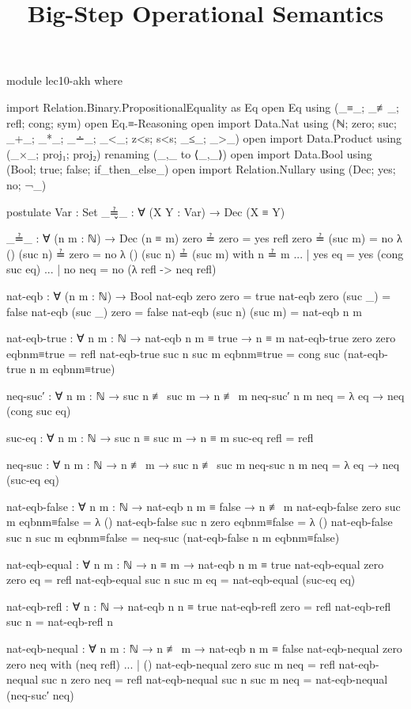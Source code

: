 \documentclass{lecturenotes}
\title{Big-Step Operational Semantics}
\begin{document}
\maketitle

\begin{code}[hide]
module lec10-akh where

import Relation.Binary.PropositionalEquality as Eq
open Eq using (_≡_; _≢_; refl; cong; sym)
open Eq.≡-Reasoning
open import Data.Nat using (ℕ; zero; suc; _+_; _*_; _∸_; _<_; z<s; s<s; _≤_; _>_)
open import Data.Product using (_×_; proj₁; proj₂) renaming (_,_ to ⟨_,_⟩)
open import Data.Bool using (Bool; true; false; if_then_else_)
open import Relation.Nullary using (Dec; yes; no; ¬_)

postulate
  Var : Set
  _≟̬_ : ∀ (X Y : Var) → Dec (X ≡ Y)

_≟_ : ∀ (n m : ℕ) → Dec (n ≡ m)
zero ≟ zero = yes refl
zero ≟ (suc m) = no λ ()
(suc n) ≟ zero = no λ ()
(suc n) ≟ (suc m) with n ≟ m
... | yes eq  = yes (cong suc eq)
... | no neq = no (λ {refl -> neq refl}) 

nat-eqb : ∀ (n m : ℕ) → Bool
nat-eqb zero zero = true
nat-eqb zero (suc _) = false
nat-eqb (suc _) zero = false
nat-eqb (suc n) (suc m) = nat-eqb n m

nat-eqb-true : ∀ {n m : ℕ} → nat-eqb n m ≡ true → n ≡ m
nat-eqb-true {zero} {zero} eqbnm≡true = refl
nat-eqb-true {suc n} {suc m} eqbnm≡true  = cong suc (nat-eqb-true {n} {m} eqbnm≡true)

neq-suc′ : ∀ {n m : ℕ} → suc n ≢ suc m → n ≢ m
neq-suc′ {n} {m} neq = λ eq → neq (cong suc eq)

suc-eq : ∀ {n m : ℕ} → suc n ≡ suc m → n ≡ m
suc-eq refl = refl

neq-suc : ∀ {n m : ℕ} → n ≢ m → suc n ≢ suc m
neq-suc {n} {m} neq = λ {eq → neq (suc-eq eq)} 

nat-eqb-false : ∀ {n m : ℕ} → nat-eqb n m ≡ false → n ≢ m
nat-eqb-false {zero} {suc m} eqbnm≡false = λ ()
nat-eqb-false {suc n} {zero} eqbnm≡false = λ () 
nat-eqb-false {suc n} {suc m} eqbnm≡false = neq-suc (nat-eqb-false {n} {m} eqbnm≡false)

nat-eqb-equal : ∀ {n m : ℕ} → n ≡ m → nat-eqb n m ≡ true
nat-eqb-equal {zero} {zero} eq = refl
nat-eqb-equal {suc n} {suc m} eq = nat-eqb-equal (suc-eq eq)

nat-eqb-refl : ∀ {n : ℕ} → nat-eqb n n ≡ true
nat-eqb-refl {zero} = refl
nat-eqb-refl {suc n} = nat-eqb-refl {n}

nat-eqb-nequal : ∀ {n m : ℕ} → n ≢ m → nat-eqb n m ≡ false
nat-eqb-nequal {zero} {zero} neq with (neq refl)
... | () 
nat-eqb-nequal {zero} {suc m} neq = refl
nat-eqb-nequal {suc n} {zero} neq = refl
nat-eqb-nequal {suc n} {suc m} neq = nat-eqb-nequal (neq-suc′ neq)


\end{code}
\end{document}
